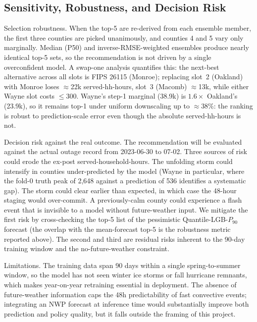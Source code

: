 \documentclass[11pt]{article}
\begin{document}
\subsection{Sensitivity, Robustness, and Decision Risk}
Selection robustness. When the top-5 are re-derived from each ensemble
member, the first three counties are picked unanimously, and counties
4 and 5 vary only marginally. Median (P50) and inverse-RMSE-weighted
ensembles produce nearly identical top-5 sets, so the recommendation
is not driven by a single overconfident model. A swap-one analysis
quantifies this: the next-best alternative across all slots is FIPS
26115 (Monroe); replacing slot~2 (Oakland) with Monroe loses
$\approx$22k served-hh-hours, slot~3 (Macomb) $\approx$13k, while
either Wayne slot costs $\le$300. Wayne's step-1 marginal (38.9k) is
$1.6\times$ Oakland's (23.9k), so it remains top-1 under uniform
downscaling up to $\approx$38\%: the ranking is robust to
prediction-scale error even though the absolute served-hh-hours is
not.

Decision risk against the real outcome. The recommendation will be
evaluated against the actual outage record from 2023-06-30 to 07-02.
Three sources of risk could erode the ex-post served-household-hours.
The unfolding storm could intensify in counties under-predicted by the
model (Wayne in particular, where the fold-0 truth peak of 2{,}648
against a prediction of 536 identifies a systematic gap). The storm
could clear earlier than expected, in which case the 48-hour staging
would over-commit. A previously-calm county could experience a flash
event that is invisible to a model without future-weather input. We
mitigate the first risk by cross-checking the top-5 list of the
pessimistic Quantile-LGB-$P_{90}$ forecast (the overlap with the
mean-forecast top-5 is the robustness metric reported above). The
second and third are residual risks inherent to the 90-day training
window and the no-future-weather constraint.

Limitations. The training data span 90 days within a single
spring-to-summer window, so the model has not seen winter ice storms
or fall hurricane remnants, which makes year-on-year retraining
essential in deployment. The absence of future-weather information
caps the 48h predictability of fast convective events; integrating an
NWP forecast at inference time would substantially improve both
prediction and policy quality, but it falls outside the framing of
this project.
\end{document}
